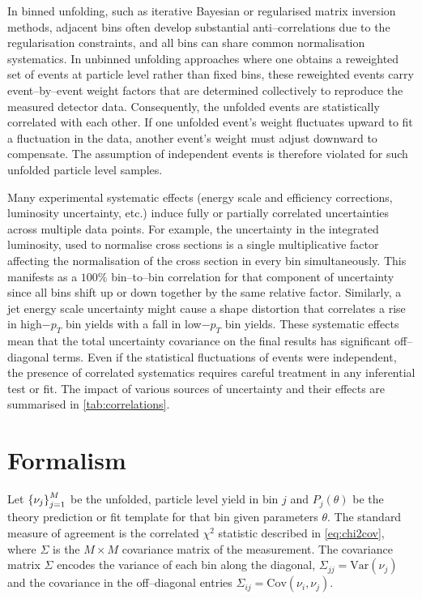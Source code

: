     In binned unfolding, such as iterative Bayesian or regularised matrix inversion methods, adjacent bins often develop substantial anti--correlations due to the regularisation constraints, and all bins can share common normalisation systematics.
    In unbinned unfolding approaches where one obtains a reweighted set of events at particle level rather than fixed bins, these reweighted events carry event--by--event weight factors that are determined collectively to reproduce the measured detector data.
    Consequently, the unfolded events are statistically correlated with each other.
    If one unfolded event’s weight fluctuates upward to fit a fluctuation in the data, another event’s weight must adjust downward to compensate.
    The assumption of independent events is therefore violated for such unfolded particle level samples.

    Many experimental systematic effects (energy scale and efficiency corrections, luminosity uncertainty, etc.) induce fully or partially correlated uncertainties across multiple data points.
    For example, the uncertainty in the integrated luminosity, used to normalise cross sections is a single multiplicative factor affecting the normalisation of the cross section in every bin simultaneously.
    This manifests as a $100\%$ bin--to--bin correlation for that component of uncertainty since all bins shift up or down together by the same relative factor.
    Similarly, a jet energy scale uncertainty might cause a shape distortion that correlates a rise in high$-p_T$ bin yields with a fall in low$-p_T$ bin yields.
    These systematic effects mean that the total uncertainty covariance on the final results has significant off--diagonal terms.
    Even if the statistical fluctuations of events were independent, the presence of correlated systematics requires careful treatment in any inferential test or fit.
    The impact of various sources of uncertainty and their effects are summarised in \cref{tab:correlations}.


\section{Formalism}
    Let $\qty{\nu_j}_{j=1}^M$ be the unfolded, particle level yield in bin $j$ and $P_j(\theta)$ be the theory prediction or fit template for that bin given parameters $\theta$.
    The standard measure of agreement is the correlated $\chi^2$ statistic described in \cref{eq:chi2cov},
    where $\Sigma$ is the $M\times M$ covariance matrix of the measurement.
    The covariance matrix $\Sigma$ encodes the variance of each bin along the diagonal, $\Sigma_{jj} = \mathrm{Var}(\nu_j)$ and the covariance in the off--diagonal entries $\Sigma_{ij} = \mathrm{Cov}(\nu_i, \nu_j)$.
    
